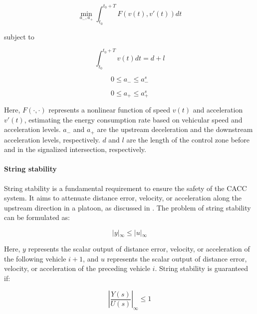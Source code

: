 \begin{equation}
\min_{a_{-}, a_{+}} \int_{t_{0}}^{t_{0}+T} F(v(t), v'(t)) dt
\end{equation}

subject to

\begin{equation}
\int_{t_{0}}^{t_{0}+T} v(t) dt = d + l
\end{equation}

\begin{equation}
0 \leq a_{-} \leq a_{-}^{s}
\end{equation}

\begin{equation}
0 \leq a_{+} \leq a_{+}^{s}
\end{equation}

Here, $F(\cdot, \cdot)$ represents a nonlinear function of speed $v(t)$ and acceleration $v'(t)$, estimating the energy consumption rate based on vehicular speed and acceleration levels. $a_-$ and $a_+$ are the upstream deceleration and the downstream acceleration levels, respectively. $d$ and $l$ are the length of the control zone before and in the signalized intersection, respectively. 







\paragraph{String stability} \label{sec: string_stability}

String stability is a fundamental requirement to ensure the safety of the CACC system. It aims to attenuate distance error, velocity, or acceleration along the upstream direction in a platoon, as discussed in \cite{rajamani2011vehicle}. The problem of string stability can be formulated as: 

\begin{equation}
|y|{_\infty} \leq|u|{_\infty}
\end{equation}

Here, $y$ represents the scalar output of distance error, velocity, or acceleration of the following vehicle $i+1$, and $u$ represents the scalar output of distance error, velocity, or acceleration of the preceding vehicle $i$. String stability is guaranteed if:

\begin{equation}
\left|\frac{Y(s)}{U(s)}\right|_{\infty} \leq 1
\end{equation}

